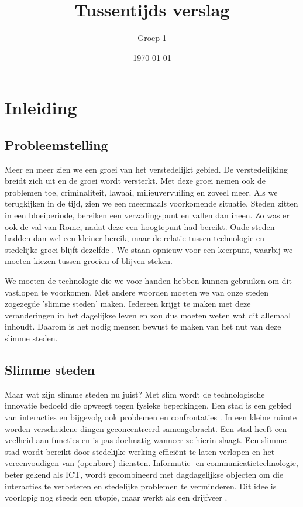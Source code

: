 \documentclass[a4paper,kulak]{kulakarticle}
\title{Tussentijds verslag}
\author{Groep 1}
\date{\today}
\begin{document}
\maketitle
\tableofcontents

\newpage

\section{Inleiding}

\subsection{Probleemstelling}
Meer en meer zien we een groei van het verstedelijkt gebied. De verstedelijking breidt zich uit en de groei wordt versterkt. Met deze groei nemen ook de problemen toe, criminaliteit, lawaai, milieuvervuiling en zoveel meer. Als we terugkijken in de tijd, zien we een meermaals voorkomende situatie. Steden zitten in een bloeiperiode, bereiken een verzadingspunt en vallen dan ineen. Zo was er ook de val van Rome, nadat deze een hoogtepunt had bereikt. Oude steden hadden dan wel een kleiner bereik, maar de relatie tussen technologie en stedelijke groei blijft dezelfde \cite{smartcities} . We staan opnieuw voor een keerpunt, waarbij we moeten kiezen tussen groeien of blijven steken.

We moeten de technologie die we voor handen hebben kunnen gebruiken om dit vastlopen te voorkomen. Met andere woorden moeten we van onze steden zogezegde \cite{taaladvies} 'slimme steden' maken. Iedereen krijgt te maken met deze veranderingen in het dagelijkse leven en zou dus moeten weten wat dit allemaal inhoudt. Daarom is het nodig mensen bewust te maken van het nut van deze slimme steden.

\subsection{Slimme steden}

Maar wat zijn slimme steden nu juist? Met slim wordt de technologische innovatie bedoeld die opweegt tegen fysieke beperkingen. Een stad is een gebied van interacties en bijgevolg ook problemen en confrontaties \cite{sc}. In een kleine ruimte worden verscheidene dingen geconcentreerd samengebracht. Een stad heeft een veelheid aan functies en is pas doelmatig \cite{synoniemen} wanneer ze hierin slaagt. Een slimme stad wordt bereikt door stedelijke werking efficiënt te laten verlopen en het vereenvoudigen van (openbare) diensten. Informatie- en communicatietechnologie, beter gekend als ICT, wordt gecombineerd met dagdagelijkse objecten om die interacties te verbeteren en stedelijke problemen te verminderen. Dit idee is voorlopig nog steeds een utopie, maar werkt als een drijfveer \cite{proconsc}.
\end{document}
